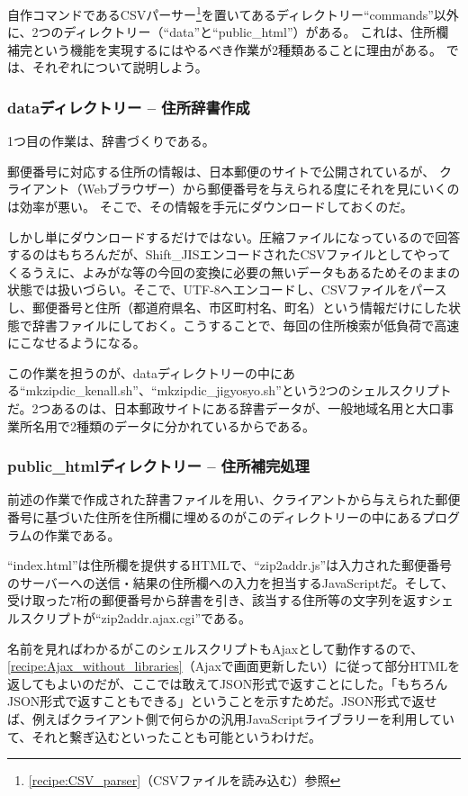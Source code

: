 自作コマンドであるCSVパーサー\footnote{\ref{recipe:CSV_parser}（CSVファイルを読み込む）参照}を置いてあるディレクトリー``commands''以外に、2つのディレクトリー（``data''と``public\_{}html''）がある。
これは、住所欄補完という機能を実現するにはやるべき作業が2種類あることに理由がある。
では、それぞれについて説明しよう。

\subsubsection*{dataディレクトリー -- 住所辞書作成}

1つ目の作業は、辞書づくりである。

郵便番号に対応する住所の情報は、日本郵便のサイトで公開されているが、
クライアント（Webブラウザー）から郵便番号を与えられる度にそれを見にいくのは効率が悪い。
そこで、その情報を手元にダウンロードしておくのだ。

しかし単にダウンロードするだけではない。圧縮ファイルになっているので回答するのはもちろんだが、Shift\_{}JISエンコードされたCSVファイルとしてやってくるうえに、よみがな等の今回の変換に必要の無いデータもあるためそのままの状態では扱いづらい。そこで、UTF-8へエンコードし、CSVファイルをパースし、郵便番号と住所（都道府県名、市区町村名、町名）という情報だけにした状態で辞書ファイルにしておく。こうすることで、毎回の住所検索が低負荷で高速にこなせるようになる。

この作業を担うのが、dataディレクトリーの中にある``mkzipdic\_{}kenall.sh''、``mkzipdic\_{}jigyosyo.sh''という2つのシェルスクリプトだ。2つあるのは、日本郵政サイトにある辞書データが、一般地域名用と大口事業所名用で2種類のデータに分かれているからである。

\subsubsection*{public\_{}htmlディレクトリー -- 住所補完処理}

前述の作業で作成された辞書ファイルを用い、クライアントから与えられた郵便番号に基づいた住所を住所欄に埋めるのがこのディレクトリーの中にあるプログラムの作業である。

``index.html''は住所欄を提供するHTMLで、``zip2addr.js''は入力された郵便番号のサーバーへの送信・結果の住所欄への入力を担当するJavaScriptだ。そして、受け取った7桁の郵便番号から辞書を引き、該当する住所等の文字列を返すシェルスクリプトが``zip2addr.ajax.cgi''である。

名前を見ればわかるがこのシェルスクリプトもAjaxとして動作するので、\ref{recipe:Ajax_without_libraries}（Ajaxで画面更新したい）に従って部分HTMLを返してもよいのだが、ここでは敢えてJSON形式で返すことにした。「もちろんJSON形式で返すこともできる」ということを示すためだ。JSON形式で返せば、例えばクライアント側で何らかの汎用JavaScriptライブラリーを利用していて、それと繋ぎ込むといったことも可能というわけだ。

